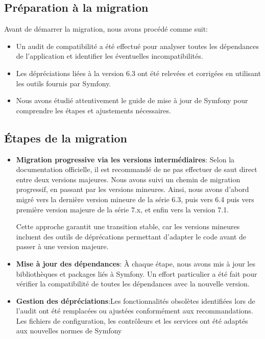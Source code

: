 \documentclass[12pt]{article}
\begin{document}
    \subsection{Préparation à la migration}
    Avant de démarrer la migration, nous avons procédé comme suit:
    \begin{itemize}
        \item Un audit de compatibilité a été effectué pour analyser toutes les dépendances de l'application et identifier les éventuelles incompatibilités.
        \item Les dépréciations liées à la version 6.3 ont été relevées et corrigées en utilisant les outils fournis par Symfony.
        \item Nous avons étudié attentivement le guide de mise à jour de Symfony pour comprendre les étapes et ajustements nécessaires.
    \end{itemize}

    \subsection{Étapes de la migration}
    \begin{itemize}
        \item \textbf{Migration progressive via les versions intermédiaires}:
        Selon la documentation officielle, il est recommandé de ne pas effectuer de saut direct entre deux versions majeures. Nous avons suivi un chemin de migration progressif, en passant par les versions mineures. Ainsi, nous avons d'abord migré vers la dernière version mineure de la série 6.3, puis vers 6.4 puis vers première version majeure de la série 7.x, et enfin vers la version 7.1.

        Cette approche garantit une transition stable, car les versions mineures incluent des outils de déprécations permettant d'adapter le code avant de passer à une version majeure.
        \item \textbf{Mise à jour des dépendances}: À chaque étape, nous avons mis à jour les bibliothèques et packages liés à Symfony. Un effort particulier a été fait pour vérifier la compatibilité de toutes les dépendances avec la nouvelle version.
        \item \textbf{Gestion des dépréciations}:Les fonctionnalités obsolètes identifiées lors de l’audit ont été remplacées ou ajustées conformément aux recommandations. Les fichiers de configuration, les contrôleurs et les services ont été adaptés aux nouvelles normes de Symfony
    \end{itemize}
\end{document}
